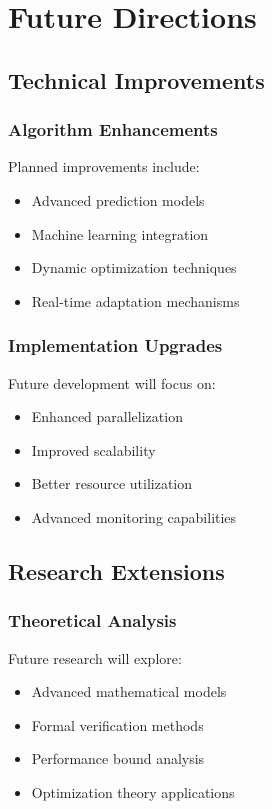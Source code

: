 \documentclass[12pt]{article}
\begin{document}
\section{Future Directions}
\subsection{Technical Improvements}
\subsubsection{Algorithm Enhancements}
Planned improvements include:
\begin{itemize}[noitemsep]
    \item Advanced prediction models
    \item Machine learning integration
    \item Dynamic optimization techniques
    \item Real-time adaptation mechanisms
\end{itemize}

\subsubsection{Implementation Upgrades}
Future development will focus on:
\begin{itemize}[noitemsep]
    \item Enhanced parallelization
    \item Improved scalability
    \item Better resource utilization
    \item Advanced monitoring capabilities
\end{itemize}

\subsection{Research Extensions}
\subsubsection{Theoretical Analysis}
Future research will explore:
\begin{itemize}[noitemsep]
    \item Advanced mathematical models
    \item Formal verification methods
    \item Performance bound analysis
    \item Optimization theory applications
\end{itemize}
\end{document}
